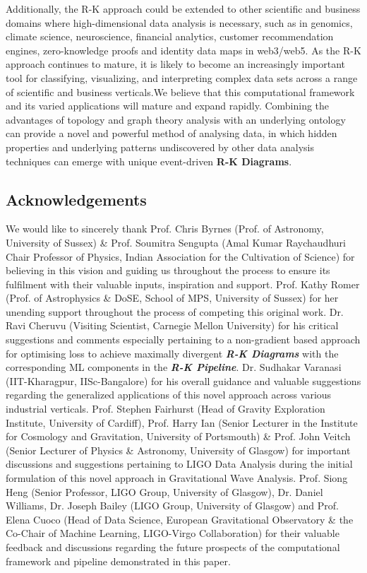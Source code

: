 Additionally, the R-K approach could be extended to other scientific and business domains where high-dimensional data analysis is necessary, such as in genomics, climate science,  neuroscience, financial analytics, customer recommendation engines, zero-knowledge proofs and identity data maps in web3/web5. As the R-K approach continues to mature, it is likely to become an increasingly important tool for classifying, visualizing, and interpreting complex data sets across a range of scientific and business verticals.We believe that this computational framework and its varied applications will mature and expand rapidly. Combining the advantages of topology and graph theory analysis with an underlying ontology can provide a novel and powerful method of analysing data, in which hidden properties and underlying patterns undiscovered by other data analysis techniques can emerge with unique event-driven \textbf{R-K Diagrams}.

\subsection{Acknowledgements}

We would like to sincerely thank Prof. Chris Byrnes (Prof. of Astronomy, University of Sussex) \& Prof. Soumitra Sengupta (Amal Kumar Raychaudhuri Chair Professor of Physics, Indian Association for the Cultivation of Science) for  believing in this vision and guiding us throughout the process to ensure its fulfilment with their valuable inputs, inspiration and support. Prof. Kathy Romer (Prof. of Astrophysics \& DoSE, School of MPS, University of Sussex) for her unending support throughout the process of competing this original work. Dr. Ravi Cheruvu (Visiting Scientist, Carnegie Mellon University) for his critical suggestions and comments especially pertaining to a non-gradient based approach for optimising loss to achieve maximally divergent \textbf{\textit{R-K Diagrams}} with the corresponding ML components in the \textbf{\textit{R-K Pipeline}}. Dr. Sudhakar Varanasi (IIT-Kharagpur, IISc-Bangalore) for his overall guidance and valuable suggestions regarding the generalized applications of this novel approach across various industrial verticals. Prof. Stephen Fairhurst (Head of Gravity Exploration Institute, University of Cardiff), Prof. Harry Ian (Senior Lecturer in the Institute for Cosmology and Gravitation, University of Portsmouth) \& Prof. John Veitch (Senior Lecturer of Physics \& Astronomy, University of Glasgow) for important discussions and suggestions pertaining to LIGO Data Analysis during the initial formulation of this novel approach in Gravitational Wave Analysis. Prof. Siong Heng (Senior Professor, LIGO Group, University of Glasgow), Dr. Daniel Williams, Dr. Joseph Bailey (LIGO Group, University of Glasgow) and Prof. Elena Cuoco (Head of Data Science, European Gravitational Observatory \& the Co-Chair of Machine Learning, LIGO-Virgo Collaboration) for their valuable feedback and discussions regarding the future prospects of the computational framework and pipeline demonstrated in this paper.
